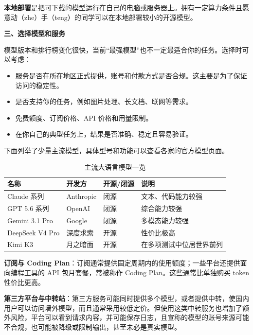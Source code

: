 \textbf{本地部署}是把可下载的模型运行在自己的电脑或服务器上。拥有一定算力条件且愿意动（zhe）手（teng）的同学可以在本地部署较小的开源模型。

\vspace{10pt}

\textbf{三、选择模型和服务}

模型版本和排行榜变化很快，当前“最强模型”也不一定最适合你的任务。选择时可以考虑：

\begin{itemize}
    \item 服务是否在所在地区正式提供，账号和付款方式是否合规。这主要是为了保证访问的稳定性。
    \item 是否支持你的任务，例如图片处理、长文档、联网等需求。
    \item 免费额度、订阅价格、API 价格和用量限制。
    \item 在你自己的典型任务上，结果是否准确、稳定且容易验证。
\end{itemize}

下面列举了少量主流模型，具体型号和功能可以查看各家的官方模型页面。

\begin{table}[htbp]
\centering
\begin{tabular}{llll}
\hline
名称 & 开发方 & 开源/闭源 & 说明 \\
\hline
Claude 系列 & Anthropic & 闭源 & 文本、代码能力较强 \\
GPT 5.6 系列 & OpenAI & 闭源 & 综合能力较强 \\
Gemini 3.1 Pro & Google & 闭源 & 多模态能力较强 \\
DeepSeek V4 Pro & 深度求索 & 开源 & 性价比极高 \\
Kimi K3 & 月之暗面 & 开源 & 在多项测试中位居世界前列 \\
\hline
\end{tabular}
\caption{主流大语言模型一览}
\end{table}

\textbf{订阅与 Coding Plan}：订阅通常提供固定周期内的使用额度；一些平台还提供面向编程工具的 API 包月套餐，常被称作 Coding Plan。这些通常比单独购买 token 性价比更高。

\textbf{第三方平台与中转站}：第三方服务可能同时提供多个模型，或者提供中转，使国内用户可以访问墙外模型，而且通常采用较低定价。但使用这类中转服务也增加了额外风险，平台可以看到请求内容，并可能保存日志，且宣称的模型的账号来源可能不合规，也可能被降级或限制输出，甚至未必是真实模型。

\vspace{10pt}

